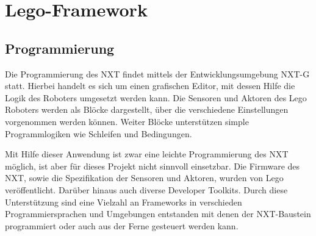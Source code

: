 \chapter{Lego-Framework}
\label{chap:Lego-Framework}


\section{Programmierung}

Die Programmierung des NXT findet mittels der Entwicklungsumgebung NXT-G statt. Hierbei handelt es sich um einen grafischen Editor, mit dessen Hilfe die Logik des Roboters umgesetzt werden kann. Die Sensoren und Aktoren des Lego Roboters werden als Blöcke dargestellt, über die verschiedene Einstellungen vorgenommen werden können. Weiter Blöcke unterstützen simple Programmlogiken wie Schleifen und Bedingungen. 
\par\smallskip 
Mit Hilfe dieser Anwendung ist zwar eine leichte Programmierung des NXT m\"oglich, ist aber f\"ur dieses Projekt nicht sinnvoll einsetzbar. Die Firmware des NXT, sowie die Spezifikation der Sensoren und Aktoren, wurden von Lego ver\"offentlicht. Dar\"uber hinaus auch diverse Developer Toolkits. Durch diese Unterst\"utzung sind eine Vielzahl an Frameworks in verschieden Programmiersprachen und Umgebungen entstanden mit denen der NXT-Baustein programmiert oder auch aus der Ferne gesteuert werden kann.
\par\smallskip 
